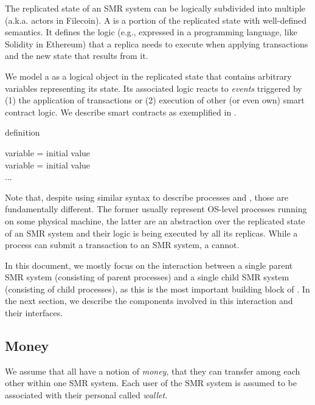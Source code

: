 The replicated state of an SMR system can be logically subdivided into multiple \emph{\dapps} (a.k.a. actors in Filecoin).
A \dapp is a portion of the replicated state with well-defined semantics.
It defines the logic (e.g., expressed in a programming language, like Solidity in Ethereum)
that a replica needs to execute when applying transactions and the new state that results from it.

We model a \dapp as a logical object in the replicated state that contains arbitrary variables representing its state.
Its associated logic reacts to \emph{events} triggered by (1) the application of transactions or (2) execution of other (or even own) smart contract logic. We describe smart contracts as exemplified in .

\begin{algorithm}[H]
\footnotesize
\caption{\dapp definition}\label{alg:dapp-definition}
  \DontPrintSemicolon
  variable = initial value\\
  variable = initial value\\
  ...\\
\end{algorithm}
Note that, despite using similar syntax to describe processes and \dapps, those are fundamentally different.
The former usually represent OS-level processes running on some physical machine,
the latter are an abstraction over the replicated state of an SMR system and their logic is being executed by all its replicas.
While a process can submit a transaction to an SMR system, a \dapp cannot.

In this document, we mostly focus on the interaction between a single parent SMR system (consisting of parent processes) and a single child SMR system (consisting of child processes), as this is the most important building block of \nameAbbr.
In the next section, we describe the components involved in this interaction and their interfaces.

\subsection{Money}

We assume that all \dapps have a notion of \emph{money}, that they can transfer among each other within one SMR system.
Each user of the SMR system is assumed to be associated with their personal \dapp called \emph{wallet}.
